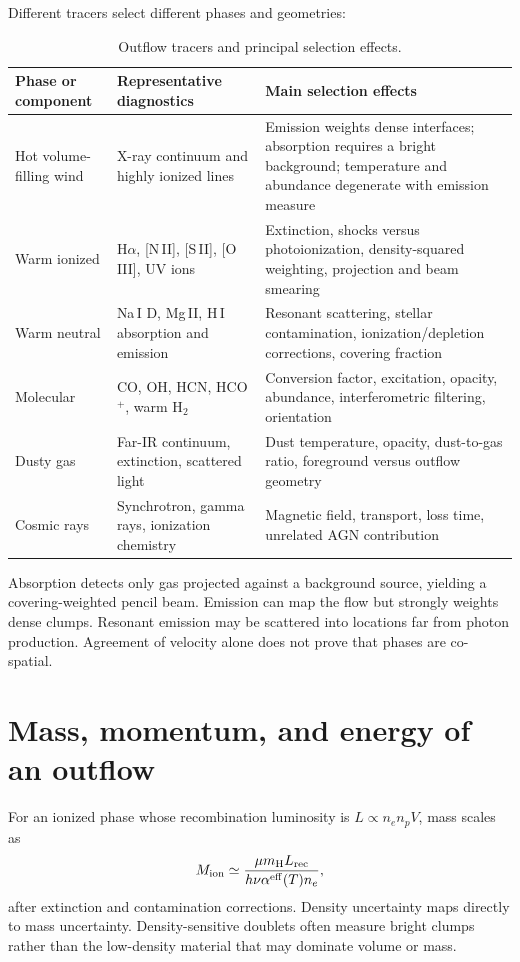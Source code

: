Different tracers select different phases and geometries:
\begin{table}[tbp]
\centering
\caption{Outflow tracers and principal selection effects.}
\label{tab:outflow-tracers}
\begin{tabularx}{\textwidth}{@{}
 >{\raggedright\arraybackslash}p{}
 >{\raggedright\arraybackslash}p{}
 >{\raggedright\arraybackslash}X@{}}
\toprule
Phase or component & Representative diagnostics & Main selection effects \\
\midrule
Hot volume-filling wind & X-ray continuum and highly ionized lines & Emission weights
dense interfaces; absorption requires a bright background; temperature and abundance
degenerate with emission measure \\
Warm ionized & H$\alpha$, [N\,II], [S\,II], [O\,III], UV ions & Extinction, shocks
versus photoionization, density-squared weighting, projection and beam smearing \\
Warm neutral & Na\,I D, Mg\,II, H\,I absorption and emission & Resonant scattering,
stellar contamination, ionization/depletion corrections, covering fraction \\
Molecular & CO, OH, HCN, HCO$^+$, warm H$_2$ & Conversion factor, excitation,
opacity, abundance, interferometric filtering, orientation \\
Dusty gas & Far-IR continuum, extinction, scattered light & Dust temperature,
opacity, dust-to-gas ratio, foreground versus outflow geometry \\
Cosmic rays & Synchrotron, gamma rays, ionization chemistry & Magnetic field,
transport, loss time, unrelated AGN contribution \\
\bottomrule
\end{tabularx}
\end{table}

Absorption detects only gas projected against a background source, yielding a
covering-weighted pencil beam.  Emission can map the flow but strongly weights dense
clumps.  Resonant emission may be scattered into locations far from photon production.
Agreement of velocity alone does not prove that phases are co-spatial.

\section{Mass, momentum, and energy of an outflow}

For an ionized phase whose recombination luminosity is
$L\propto n_en_pV$, mass scales as
\begin{equation}
 M_{\rm ion}\simeq
 \frac{\mu m_{\rm H}L_{\rm rec}}
 {h\nu\alpha^{\rm eff}(T)n_e},
 \label{eq:ionized-outflow-mass}
\end{equation}
after extinction and contamination corrections.  Density uncertainty maps directly
to mass uncertainty.  Density-sensitive doublets often measure bright clumps rather
than the low-density material that may dominate volume or mass.

